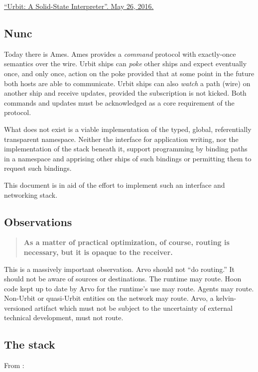 \href{https://media.urbit.org/whitepaper.pdf}{``Urbit: A Solid-State
Interpreter''. May 26, 2016.}

\subsection{Nunc}

Today there is Ames. Ames provides a \emph{command} protocol with
exactly-once semantics over the wire. Urbit ships can \emph{poke} other
ships and expect eventually once, and only once, action on the poke
provided that at some point in the future both hosts are able to
communicate. Urbit ships can also \emph{watch} a path (wire) on another
ship and receive updates, provided the subscription is not kicked. Both
commands and updates must be acknowledged as a core requirement of the
protocol.

What does not exist is a viable implementation of the typed, global,
referentially transparent namespace. Neither the interface for
application writing, nor the implementation of the stack beneath it,
support programming by binding paths in a namespace and apprising other
ships of such bindings or permitting them to request such bindings.

This document is in aid of the effort to implement such an interface and
networking stack.

\subsection{Observations}

\begin{quote}
\textbf{As a matter of practical optimization, of course, routing is
necessary, but it is opaque to the receiver.}
\end{quote}

This is a massively important observation. Arvo should not ``do
routing.'' It should not be aware of sources or destinations. The
runtime may route. Hoon code kept up to date by Arvo for the runtime's
use may route. Agents may route. Non-Urbit or quasi-Urbit entities on
the network may route. Arvo, a kelvin-versioned artifact which must not
be subject to the uncertainty of external technical development, must
not route.

\subsection{The stack}

From :

